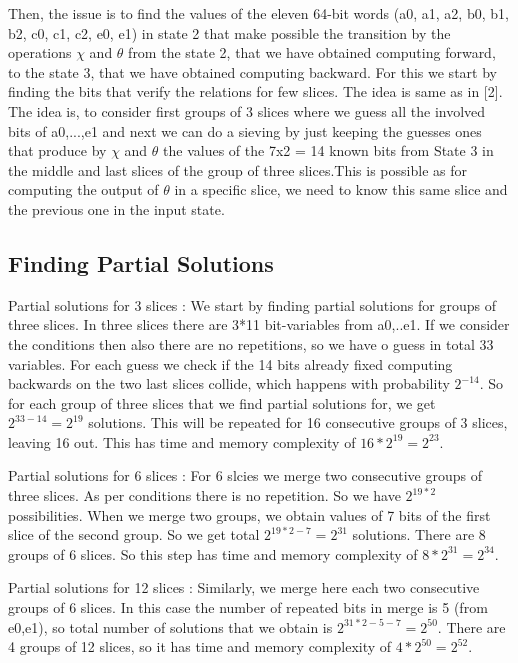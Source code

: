 \documentclass{article}
\begin{document}
\newpar
Then, the issue is to find the values of the eleven 64-bit words (a0, a1, a2, b0, b1, b2, c0, c1, c2, e0, e1) in state 2 that make possible the transition by the operations $\chi$ and $\theta$ from the state 2, that we have obtained computing forward, to the state 3, that we have obtained computing backward. For this we start by finding the bits that verify the relations for few slices.  The idea is same as in [2]. The idea is, to consider first groups of 3 slices where we guess all the involved bits of a0,...,e1 and next we can do a sieving by just keeping the guesses ones that produce by $\chi$ and $\theta$ the values of the 7x2 = 14 known bits from State 3 in the middle and last slices of the group of three slices.This is possible as for computing the output of $\theta$ in a specific slice, we need to know this same slice and the previous one in the input state.

\subsection{Finding Partial Solutions}

\newpar
Partial solutions for 3 slices : We start by finding partial solutions for groups of three slices. In three slices there are 3*11 bit-variables from a0,..e1. If we consider the conditions then also there are no repetitions, so we have o guess in total 33 variables. For each guess we check if the 14 bits already fixed computing backwards on the two last slices collide, which happens with probability $2^{-14}$. So for each group of three slices that we find partial solutions for, we get $2^{33 - 14} = 2^{19}$ solutions. This will be repeated for 16 consecutive groups of 3 slices, leaving 16 out. This has time and memory complexity of $16 * 2^{19} = 2^{23}$.

\newpar
Partial solutions for 6 slices : For 6 slcies we merge two consecutive groups of three slices. As per conditions there is no repetition. So we have $2^{19*2}$ possibilities. When we merge two groups, we obtain values of 7 bits of the first slice of the second group. So we get total $2^{19*2 - 7 } = 2^{31}$ solutions. There are 8 groups of 6 slices. So this step has time and memory complexity of $8*2^{31} = 2^{34}$.

\newpar
Partial solutions for 12 slices : Similarly, we merge here each two consecutive groups of 6 slices. In this case the number of repeated bits in merge is 5 (from e0,e1), so total number of solutions that we obtain is $2^{31*2 - 5 - 7 } = 2^{50}$. There are 4 groups of 12 slices, so it has time and memory complexity of $4*2^{50} = 2^{52}$.
\end{document}
